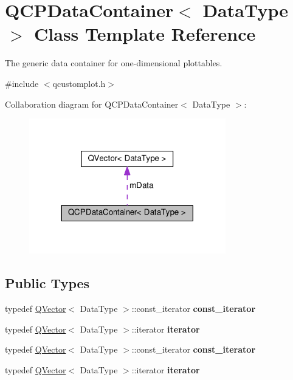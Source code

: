 \hypertarget{class_q_c_p_data_container}{}\section{Q\+C\+P\+Data\+Container$<$ Data\+Type $>$ Class Template Reference}
\label{class_q_c_p_data_container}


The generic data container for one-\/dimensional plottables.  




{\ttfamily \#include $<$qcustomplot.\+h$>$}



Collaboration diagram for Q\+C\+P\+Data\+Container$<$ Data\+Type $>$\+:\nopagebreak
\begin{figure}[H]
\begin{center}
\leavevmode
\includegraphics[width=242pt]{class_q_c_p_data_container__coll__graph}
\end{center}
\end{figure}
\subsection*{Public Types}
\begin{DoxyCompactItemize}
\item 
typedef \hyperlink{class_q_vector}{Q\+Vector}$<$ Data\+Type $>$\+::const\+\_\+iterator {\bfseries const\+\_\+iterator}\hypertarget{class_q_c_p_data_container_ae40a91f5cb0bcac61d727427449b7d15}{}\label{class_q_c_p_data_container_ae40a91f5cb0bcac61d727427449b7d15}

\item 
typedef \hyperlink{class_q_vector}{Q\+Vector}$<$ Data\+Type $>$\+::iterator {\bfseries iterator}\hypertarget{class_q_c_p_data_container_a1bb453c3ae37d1ee5268878acb3a9d29}{}\label{class_q_c_p_data_container_a1bb453c3ae37d1ee5268878acb3a9d29}

\item 
typedef \hyperlink{class_q_vector}{Q\+Vector}$<$ Data\+Type $>$\+::const\+\_\+iterator {\bfseries const\+\_\+iterator}\hypertarget{class_q_c_p_data_container_ae40a91f5cb0bcac61d727427449b7d15}{}\label{class_q_c_p_data_container_ae40a91f5cb0bcac61d727427449b7d15}

\item 
typedef \hyperlink{class_q_vector}{Q\+Vector}$<$ Data\+Type $>$\+::iterator {\bfseries iterator}\hypertarget{class_q_c_p_data_container_a1bb453c3ae37d1ee5268878acb3a9d29}{}\label{class_q_c_p_data_container_a1bb453c3ae37d1ee5268878acb3a9d29}

\end{DoxyCompactItemize}

